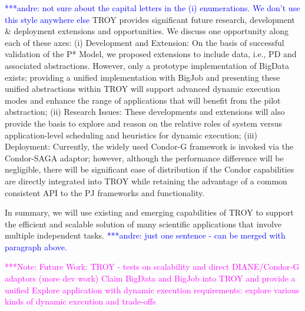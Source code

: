 \documentclass[conference,final]{IEEEtran}
\newcommand{\alnote}[1]{ {\textcolor{blue} { ***andre: #1 }}}
\newcommand{\note}[1]{ {\textcolor{magenta} { ***Note: #1 }}}
\newcommand{\alnote}[1]{}
\newcommand{\note}[1]{}
\begin{document}
\alnote{not sure about the capital letters in the (i) enumerations.
We don't use this style anywhere else}
TROY provides significant future research, development \& deployment
extensions and opportunities. We discuss one opportunity along each of
these axes: (i) Development and Extension: On the basis of successful
validation of the P* Model, we proposed extensions to include data,
i.e., PD and associated abstractions. However, only a prototype
implementation of BigData exists; providing a unified implementation
with BigJob and presenting these unified abstractions within TROY will
support advanced dynamic execution modes and enhance the range of
applications that will benefit from the pilot abstraction; (ii)
Research Issues: These developments and extensions will also provide
the basis to explore and reason on the relative roles of system versus
application-level scheduling and heuristics for dynamic execution;
(iii) Deployment: Currently, the widely used Condor-G 
framework is invoked via the Condor-SAGA adaptor; however, although
the performance difference will be negligible, there will be
significant ease of distribution if the Condor capabilities are directly 
integrated into TROY while retaining the advantage of a
common consistent API to the PJ frameworks and functionality.  %


In summary, we will use existing and emerging capabilities of TROY to
support the efficient and scalable solution of many scientific
applications that involve multiple independent tasks.\alnote{just one sentence - can be merged with paragraph above.}


\note{Future Work: TROY - tests on scalability and direct
  DIANE/Condor-G adaptors (more dev work) Claim BigData and BigJob
  into TROY and provide a unified Explore application with dynamic
  execution requirements: explore various kinds of dynamic execution
  and trade-offs }




\end{document}
